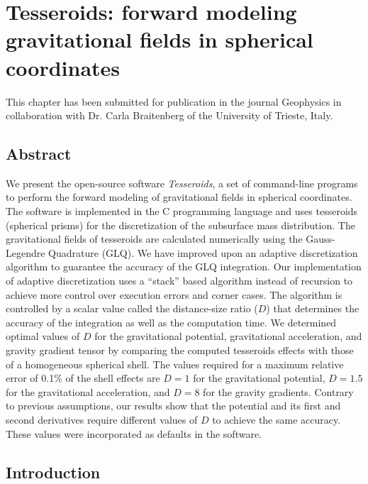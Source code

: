 \chapter{Tesseroids: forward modeling gravitational fields in spherical coordinates}
\label{chap:tesseroids}


This chapter has been submitted for publication in the journal Geophysics in
collaboration with Dr. Carla Braitenberg of the University of Trieste, Italy.

\section{Abstract}

We present the open-source software \emph{Tesseroids},
a set of command-line programs to perform the forward modeling
of gravitational fields in spherical coordinates.
The software is implemented in the C programming language and uses tesseroids
(spherical prisms) for the discretization of the subsurface mass distribution.
The gravitational fields of tesseroids are calculated numerically using
the Gauss-Legendre Quadrature (GLQ).
We have improved upon an adaptive discretization algorithm
to guarantee the accuracy of the GLQ integration.
Our implementation of adaptive discretization
uses a ``stack'' based algorithm
instead of recursion to achieve
more control over execution errors and corner cases.
The algorithm is controlled by
a scalar value called the distance-size ratio ($D$)
that determines the accuracy of the integration as well as
the computation time.
We determined optimal values of $D$
for the gravitational potential, gravitational acceleration,
and gravity gradient tensor
by comparing the computed tesseroids effects
with those of a homogeneous spherical shell.
The values required for a maximum relative error of 0.1\% of the shell effects
are $D = 1$ for the gravitational potential, $D = 1.5$ for the gravitational
acceleration, and $D = 8$ for the gravity gradients.
Contrary to previous assumptions,
our results show that the potential and its first and second derivatives
require different values of $D$ to achieve the same accuracy.
These values were incorporated as defaults in the software.


\section{Introduction}



